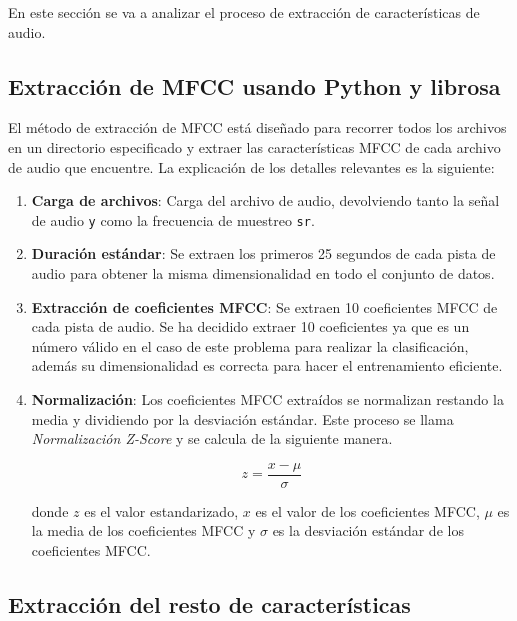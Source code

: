 En este sección se va a analizar el proceso de extracción de características de audio.

\subsection{Extracción de MFCC usando Python y librosa}

El método de extracción de MFCC está diseñado para recorrer todos los archivos en un directorio especificado y extraer las características MFCC de cada archivo de audio que encuentre. La explicación de los detalles relevantes es la siguiente:

\begin{enumerate}
\tightlist
\item \textbf{Carga de archivos}: Carga del archivo de audio, devolviendo tanto la señal de audio \texttt{y} como la frecuencia de muestreo \texttt{sr}.

\item \textbf{Duración estándar}: Se extraen los primeros 25 segundos de cada pista de audio para obtener la misma dimensionalidad en todo el conjunto de datos.

\item\textbf{Extracción de coeficientes MFCC}: Se extraen 10 coeficientes MFCC de cada pista de audio. Se ha decidido extraer 10 coeficientes ya que es un número válido en el caso de este problema para realizar la clasificación, además su dimensionalidad es correcta para hacer el entrenamiento eficiente.

\item \textbf{Normalización}: Los coeficientes MFCC extraídos se normalizan restando la media y dividiendo por la desviación estándar. Este proceso se llama \textit{Normalización Z-Score} y se calcula de la siguiente manera.

\begin{equation}
z = \frac{x - \mu}{\sigma}
\end{equation}

donde \(z\) es el valor estandarizado, \(x\) es el valor de los coeficientes MFCC, \(\mu\) es la media de los coeficientes MFCC y \(\sigma\) es la desviación estándar de los coeficientes MFCC.

\end{enumerate}

\subsection{Extracción del resto de características}

